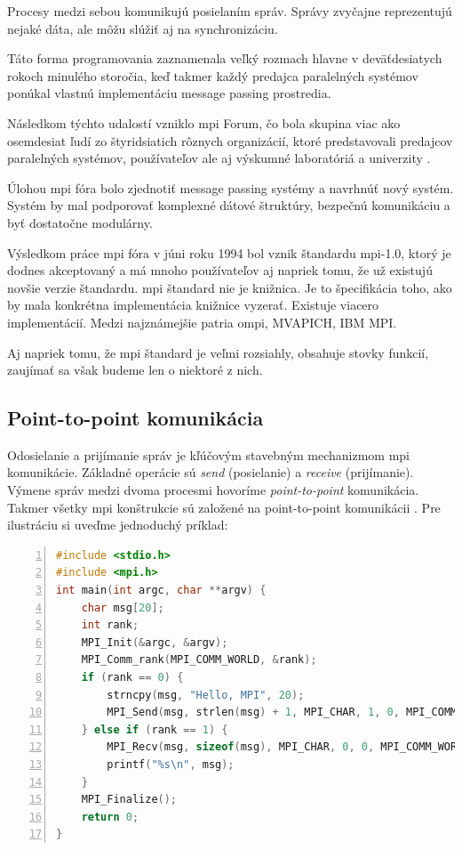 Procesy medzi sebou komunikujú posielaním správ.
Správy zvyčajne reprezentujú nejaké dáta, ale môžu slúžiť aj na synchronizáciu.

Táto forma programovania zaznamenala veľký rozmach hlavne v deväťdesiatych rokoch minulého storočia,
keď takmer každý predajca paralelných systémov ponúkal vlastnú implementáciu message passing prostredia.

Následkom týchto udalostí vzniklo \acrfull{mpi} Forum, čo bola skupina viac ako osemdesiat ľudí zo štyridsiatich rôznych organizácií,
ktoré predstavovali predajcov paralelných systémov, používateľov ale aj výskumné laboratóriá a univerzity \cite{mpibook}.

Úlohou \acrshort{mpi} fóra bolo zjednotiť message passing systémy a navrhnúť nový systém.
Systém by mal podporovať komplexné dátové štruktúry, bezpečnú komunikáciu a byť dostatočne modulárny.

Výsledkom práce \acrshort{mpi} fóra v júni roku 1994 bol vznik štandardu \acrshort{mpi}-1.0,
ktorý je dodnes akceptovaný a má mnoho používateľov aj napriek tomu, že už existujú novšie verzie štandardu.
\acrshort{mpi} štandard nie je knižnica. Je to špecifikácia toho, ako by mala konkrétna implementácia knižnice vyzerať.
Existuje viacero implementácií. Medzi najznámejšie patria \acrshort{ompi}, MVAPICH, IBM MPI.

Aj napriek tomu, že \acrshort{mpi} štandard je veľmi rozsiahly, obsahuje stovky funkcií, zaujímať sa však budeme len o niektoré z nich.

\subsection{Point-to-point komunikácia}
Odosielanie a prijímanie správ je kľúčovým stavebným mechanizmom \acrshort{mpi} komunikácie.
Základné operácie sú \textit{send} (posielanie) a \textit{receive} (prijímanie).
Výmene správ medzi dvoma procesmi hovoríme \textit{point-to-point} komunikácia.
Takmer všetky \acrshort{mpi} konštrukcie sú založené na point-to-point komunikácii \cite{mpi3-1}.
Pre ilustráciu si uveďme jednoduchý príklad:

\begin{lstlisting}[language=c, caption={Point-to-point komunikácia}, label={mpi:1}, numbers=left]
#include <stdio.h>
#include <mpi.h>
int main(int argc, char **argv) {
    char msg[20];
    int rank;
    MPI_Init(&argc, &argv);
    MPI_Comm_rank(MPI_COMM_WORLD, &rank);
    if (rank == 0) {
        strncpy(msg, "Hello, MPI", 20);
        MPI_Send(msg, strlen(msg) + 1, MPI_CHAR, 1, 0, MPI_COMM_WORLD);
    } else if (rank == 1) {
        MPI_Recv(msg, sizeof(msg), MPI_CHAR, 0, 0, MPI_COMM_WORLD, MPI_STATUS_IGNORE);
        printf("%s\n", msg);
    }
    MPI_Finalize();
    return 0;
}
\end{lstlisting}

